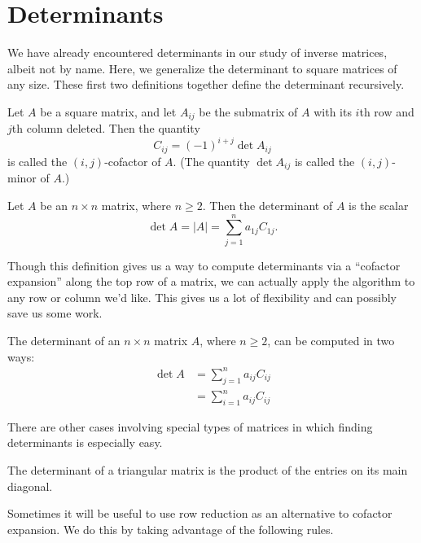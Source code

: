\documentclass[../m73main.tex]{chapters}
\begin{document}
\section{Determinants}
We have already encountered determinants in our study of inverse matrices, albeit not by name.
Here, we generalize the determinant to square matrices of any size.
These first two definitions together define the determinant recursively.

\begin{definition}[Cofactor]
	Let $A$ be a square matrix, and let $A_{ij}$ be the submatrix of $A$ with its $i$th row and $j$th column deleted.
	Then the quantity
	\[ C_{ij} = (-1)^{i+j} \det A_{ij} \]
	is called the $(i,j)$-cofactor of $A$.
	(The quantity $\det A_{ij}$ is called the $(i,j)$-minor of $A$.)
\end{definition}

\begin{definition}[Determinant]
	Let $A$ be an $n \times n$ matrix, where $n \geq 2$.
	Then the determinant of $A$ is the scalar
	\[ \det A = |A| = \sum_{j = 1}^{n} a_{1j} C_{1j}. \]
\end{definition}

Though this definition gives us a way to compute determinants via a ``cofactor expansion'' along the top row of a matrix, we can actually apply the algorithm to any row or column we'd like.
This gives us a lot of flexibility and can possibly save us some work.

\begin{theorem}
	The determinant of an $n \times n$ matrix $A$, where $n \geq 2$, can be computed  in two ways:
	\begin{align*}
		\det A &= \sum_{j = 1}^{n} a_{ij} C_{ij} \\
			   &= \sum_{i = 1}^{n} a_{ij} C_{ij}
	\end{align*}
\end{theorem}

There are other cases involving special types of matrices in which finding determinants is especially easy.

\begin{theorem}
	The determinant of a triangular matrix is the product of the entries on its main diagonal.
\end{theorem}

Sometimes it will be useful to use row reduction as an alternative to cofactor expansion.
We do this by taking advantage of the following rules.
\end{document}
